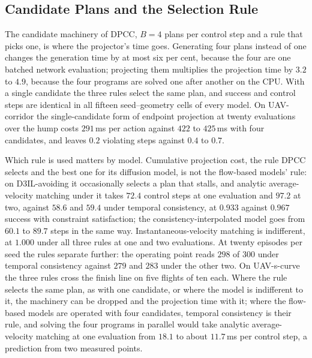 \subsection{Candidate Plans and the Selection Rule}\label{sec:disc:selection}

The candidate machinery of \ac{DPCC}, $B = 4$ plans per control step and a rule that picks one, is
where the projector's time goes. Generating four plans instead of one changes the generation time by
at most six per cent, because the four are one batched network evaluation; projecting them
multiplies the projection time by $3.2$ to $4.9$, because the four programs are solved one after
another on the CPU. With a single candidate the three rules select the same plan, and success and
control steps are identical in all fifteen seed--geometry cells of every model. On UAV-corridor the
single-candidate form of endpoint projection at twenty evaluations over the hump costs $291$\,ms per
action against $422$ to $425$\,ms with four candidates, and leaves $0.2$ violating steps against $0.4$
to $0.7$.

Which rule is used matters by model. Cumulative projection cost, the rule \ac{DPCC} selects and the
best one for its diffusion model, is not the flow-based models' rule: on D3IL-avoiding it occasionally
selects a plan that stalls, and analytic average-velocity matching under it takes $72.4$ control steps
at one evaluation and $97.2$ at two, against $58.6$ and $59.4$ under temporal consistency, at $0.933$
against $0.967$ success with constraint satisfaction; the consistency-interpolated model goes from
$60.1$ to $89.7$ steps in the same way. Instantaneous-velocity matching is indifferent, at $1.000$
under all three rules at one and two evaluations. At twenty episodes per seed the rules separate
further: the operating point reads $298$ of $300$ under temporal consistency against $279$ and $283$
under the other two. On UAV-s-curve the three rules cross the finish line on five flights of ten each.
Where the rule selects the same plan, as with one candidate, or where the model is indifferent to it,
the machinery can be dropped and the projection time with it; where the flow-based models are operated
with four candidates, temporal consistency is their rule, and solving the four programs in parallel
would take analytic average-velocity matching at one evaluation from $18.1$ to about $11.7$\,ms per
control step, a prediction from two measured points.

